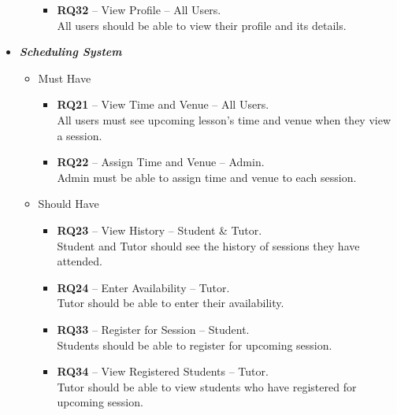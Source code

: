 \begin{justify}
\begin{itemize}
\begin{itemize}
\begin{itemize}
                        \item \textbf{\textcolor{vin}{RQ32}} -- View Profile -- All Users.\\All users should be able to view their profile and its details.
                    \end{itemize}
            \end{itemize}
            
        \item \textbf{\textit{Scheduling System}}
            \begin{itemize}
                \item Must Have
                    \begin{itemize}
                        \item \textbf{\textcolor{vin}{RQ21}} -- View Time and Venue -- All Users.\\All users must see upcoming lesson’s time and venue when they view a session.
                        
                        \item \textbf{\textcolor{vin}{RQ22}} -- Assign Time and Venue -- Admin.\\Admin must be able to assign time and venue to each session.
                    \end{itemize}
                    
                \item Should Have
                    \begin{itemize}
                        \item \textbf{\textcolor{vin}{RQ23}} -- View History -- Student \& Tutor.\\Student and Tutor should see the history of sessions they have attended.

                        \item \textbf{\textcolor{vin}{RQ24}} -- Enter Availability -- Tutor.\\Tutor should be able to enter their availability.
                        
                        \item \textbf{\textcolor{vin}{RQ33}} -- Register for Session -- Student.\\Students should be able to register for upcoming session.

                        \item \textbf{\textcolor{vin}{RQ34}} -- View Registered Students -- Tutor.\\Tutor should be able to view students who have registered for upcoming session.
                    \end{itemize}
                    

\end{itemize}
\end{itemize}
\end{justify}
